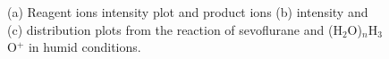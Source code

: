 \begin{figure}%
\centering
{}



\caption{(a) Reagent ions intensity plot and product ions  (b) intensity and (c) distribution plots from the reaction of sevoflurane and (H$_2$O)$_n$H$_3$O$^+$ in humid conditions.}
\label{fig:sevo_h3o_h}
\end{figure}











